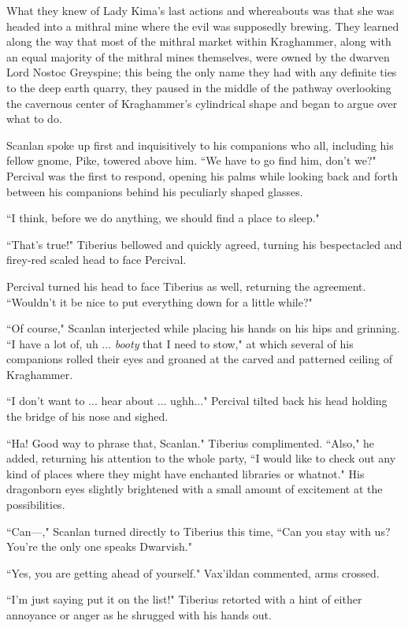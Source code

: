What they knew of Lady Kima's last actions and whereabouts was that she was headed into a mithral mine where the evil was supposedly brewing. They learned along the way that most of the mithral market within Kraghammer, along with an equal majority of the mithral mines themselves, were owned by the dwarven Lord Nostoc Greyspine; this being the only name they had with any definite ties to the deep earth quarry, they paused in the middle of the pathway overlooking the cavernous center of Kraghammer's cylindrical shape and began to argue over what to do. 

Scanlan spoke up first and inquisitively to his companions who all, including his fellow gnome, Pike, towered above him. ``We have to go find him, don't we?" Percival was the first to respond, opening his palms while looking back and forth between his companions behind his peculiarly shaped glasses.
    
``I think, before we do anything, we should find a place to sleep."

``That's true!" Tiberius bellowed and quickly agreed, turning his bespectacled and firey-red scaled head to face Percival.

Percival turned his head to face Tiberius as well, returning the agreement. ``Wouldn't it be nice to put everything down for a little while?" 

``Of course," Scanlan interjected while placing his hands on his hips and grinning. ``I have a lot of, uh ... \textit{booty} that I need to stow," at which several of his companions rolled their eyes and groaned at the carved and patterned ceiling of Kraghammer.

``I don't want to  ... hear about ... ughh..." Percival tilted back his head holding the bridge of his nose and sighed.

``Ha! Good way to phrase that, Scanlan." Tiberius complimented. ``Also," he added, returning his attention to the whole party, ``I would like to check out any kind of places where they might have enchanted libraries or whatnot." His dragonborn eyes slightly brightened with a small amount of excitement at the possibilities.

``Can---," Scanlan turned directly to Tiberius this time, ``Can you stay with us? You're the only one speaks Dwarvish."

``Yes, you are getting ahead of yourself." Vax'ildan commented, arms crossed.

``I'm just saying put it on the list!" Tiberius retorted with a hint of either annoyance or anger as he shrugged with his hands out.

